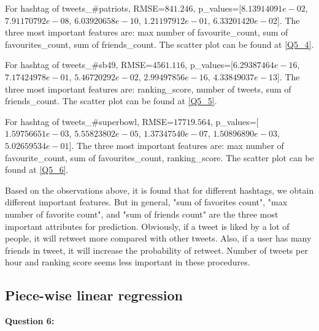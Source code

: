 \documentclass{article}
\begin{document}
\indent For hashtag of tweets\_\#patriots, RMSE=$841.246$, p\_values=[$8.13914091e-02$, $7.91170792e-08$, $6.03920658e-10$, $1.21197912e-01$, $6.33201420e-02$]. The three most important features are: max number of favourite\_count, sum of favourites\_count, sum of friends\_count. The scatter plot can be found at \ref{Q5_4}.\newline

\indent For hashtag of tweets\_\#sb49, RMSE=$4561.116$, p\_values=[$6.29387464e-16$, $7.17424978e-01$, $5.46720292e-02$, $2.99497856e-16$, $4.33849037e-13$]. The three most important features are: ranking\_score, number of tweets, sum of friends\_count. The scatter plot can be found at \ref{Q5_5}.\newline

\indent For hashtag of tweets\_\#superbowl, RMSE=$17719.564$, p\_values=[$1.59756651e-03$, $5.55823802e-05$, $1.37347540e-07$, $1.50896890e-03$, $5.02659534e-01$]. The three most important features are: max number of favourite\_count, sum of favourites\_count, ranking\_score. The scatter plot can be found at \ref{Q5_6}.\newline

\indent Based on the observations above, it is found that for different hashtags, we obtain different important features. But in general, "sum of favorites count", "max number of favorite count", and "sum of friends count" are the three most important attributes for prediction. Obviously, if a tweet is liked by a lot of people, it will retweet more compared with other tweets. Also, if a user has many friends in tweet, it will increase the probability of retweet. Number of tweets per hour and ranking score seems less important in these procedures.


\bigbreak
\subsection{Piece-wise linear regression}
\textbf{Question 6:}

\begin{table}[h]
\center
\caption{MSE and R2 Score for tweets\_\#gohawks}
\label{tab:Q6_1}
\end{table}
\end{document}
